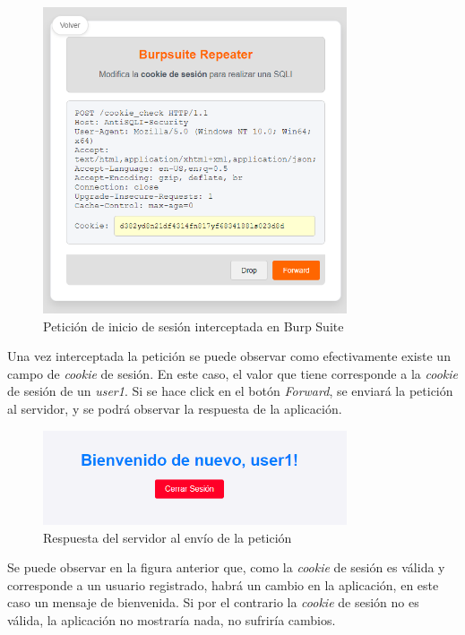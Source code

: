 \documentclass[a4paper,12pt]{article}
\begin{document}
\begin{figure}[H]
    \centering
    \includegraphics[width=0.8\textwidth]{Imagenes/blind3.png}
    \caption{Petición de inicio de sesión interceptada en Burp Suite}
\end{figure}

Una vez interceptada la petición se puede observar como efectivamente existe un campo de \textit{cookie} de sesión. En este caso, el valor que tiene corresponde a la \textit{cookie} de sesión de un \textit{user1}. Si se hace click en el botón \textit{Forward}, se enviará la petición al servidor, y se podrá observar la respuesta de la aplicación.

\begin{figure}[H]
    \centering
    \includegraphics[width=0.8\textwidth]{Imagenes/blind4.png}
    \caption{Respuesta del servidor al envío de la petición}
\end{figure}

Se puede observar en la figura anterior que, como la \textit{cookie} de sesión es válida y corresponde a un usuario registrado, habrá un cambio en la aplicación, en este caso un mensaje de bienvenida. Si por el contrario la \textit{cookie} de sesión no es válida, la aplicación no mostraría nada, no sufriría cambios.\\
\end{document}
